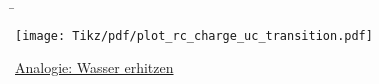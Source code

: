 \begin{frame}
{	%

}%
\b{%
	\begin{minipage}{\textwidth}%
		\begin{minipage}{0.48\textwidth}\centering
		\end{minipage}%
		\begin{minipage}{0.48\textwidth}\centering
			\texttt{[image: Tikz/pdf/plot\_rc\_charge\_uc\_transition.pdf]}
		\end{minipage}
	\end{minipage}
	\vspace{0.5cm}
	\pause

	\begin{minipage}{\textwidth}%
		\begin{minipage}[t]{0.48\textwidth}\centering
			\underline{Analogie: Wasser erhitzen}\footnotemark
			\vspace{2mm}


\end{minipage}
\end{minipage}}
\end{frame}
